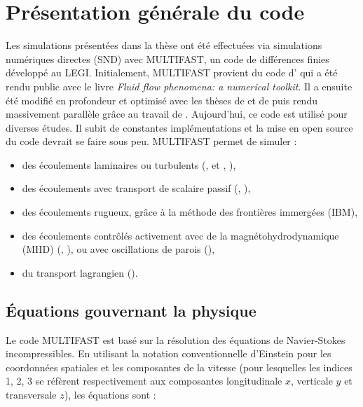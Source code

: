 \clearpage
\section{Présentation générale du code}

Les simulations présentées dans la thèse ont été effectuées via simulations numériques directes (SND) avec MULTIFAST, un code de différences finies développé au LEGI. Initialement, MULTIFAST provient du code d'\cite{Orlandi2000} qui a été rendu public avec le livre \textit{Fluid flow phenomena: a numerical toolkit}. Il a ensuite été modifié en profondeur et optimisé avec les thèses de \cite{Bouillon_PhDThesis} et de \cite{Doche_PhDThesis} puis rendu massivement parallèle grâce au travail de \cite{Bauer_PhDThesis}. Aujourd'hui, ce code est utilisé pour diverses études. Il subit de constantes implémentations et la mise en open source du code devrait se faire sous peu. MULTIFAST permet de simuler :

\begin{itemize}
    \item des écoulements laminaires ou turbulents (\cite{Tardu2017}, \cite{Tardu2017b} et \cite{Tardu2017c}, \cite{Tardu2022}),
    \item des écoulements avec transport de scalaire passif (\cite{Arrondeau2022}, \cite{Arrondeau2023}),
    \item des écoulements rugueux, grâce à la méthode des frontières immergées (IBM),
    \item des écoulements contrôlés activement avec de la magnétohydrodynamique (MHD) (\cite{Doche2021}, \cite{Capogna2023}), ou avec oscillations de parois (\cite{Umair2022}),
    \item du transport lagrangien (\cite{Schillings2017}).
\end{itemize}

\subsection{Équations gouvernant la physique}

Le code MULTIFAST est basé sur la résolution des équations de Navier-Stokes incompressibles. En utilisant la notation conventionnelle d'Einstein pour les coordonnées spatiales et les composantes de la vitesse (pour lesquelles les indices 1, 2, 3 se réfèrent respectivement aux composantes longitudinale $x$, verticale $y$ et transversale $z$), les équations sont :

